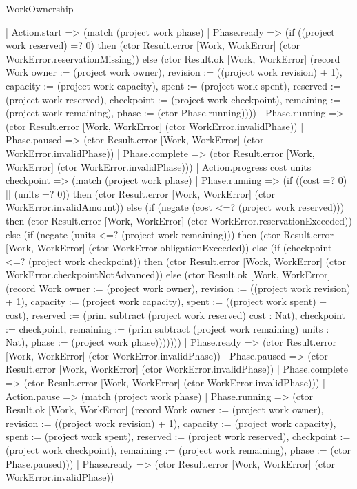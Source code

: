 \begin{lexlean}{WorkOwnership}
\begin{semanticmodule}
{    | Action.start => (match (project work phase)
      | Phase.ready => (if ((project work reserved) =? 0) then (ctor Result.error [Work, WorkError] (ctor WorkError.reservationMissing)) else (ctor Result.ok [Work, WorkError] (record Work {owner := (project work owner), revision := ((project work revision) + 1), capacity := (project work capacity), spent := (project work spent), reserved := (project work reserved), checkpoint := (project work checkpoint), remaining := (project work remaining), phase := (ctor Phase.running)})))
      | Phase.running => (ctor Result.error [Work, WorkError] (ctor WorkError.invalidPhase))
      | Phase.paused => (ctor Result.error [Work, WorkError] (ctor WorkError.invalidPhase))
      | Phase.complete => (ctor Result.error [Work, WorkError] (ctor WorkError.invalidPhase)))
    | Action.progress cost units checkpoint => (match (project work phase)
      | Phase.running => (if ((cost =? 0) || (units =? 0)) then (ctor Result.error [Work, WorkError] (ctor WorkError.invalidAmount)) else (if (negate (cost <=? (project work reserved))) then (ctor Result.error [Work, WorkError] (ctor WorkError.reservationExceeded)) else (if (negate (units <=? (project work remaining))) then (ctor Result.error [Work, WorkError] (ctor WorkError.obligationExceeded)) else (if (checkpoint <=? (project work checkpoint)) then (ctor Result.error [Work, WorkError] (ctor WorkError.checkpointNotAdvanced)) else (ctor Result.ok [Work, WorkError] (record Work {owner := (project work owner), revision := ((project work revision) + 1), capacity := (project work capacity), spent := ((project work spent) + cost), reserved := (prim subtract (project work reserved) cost : Nat), checkpoint := checkpoint, remaining := (prim subtract (project work remaining) units : Nat), phase := (project work phase)}))))))
      | Phase.ready => (ctor Result.error [Work, WorkError] (ctor WorkError.invalidPhase))
      | Phase.paused => (ctor Result.error [Work, WorkError] (ctor WorkError.invalidPhase))
      | Phase.complete => (ctor Result.error [Work, WorkError] (ctor WorkError.invalidPhase)))
    | Action.pause => (match (project work phase)
      | Phase.running => (ctor Result.ok [Work, WorkError] (record Work {owner := (project work owner), revision := ((project work revision) + 1), capacity := (project work capacity), spent := (project work spent), reserved := (project work reserved), checkpoint := (project work checkpoint), remaining := (project work remaining), phase := (ctor Phase.paused)}))
      | Phase.ready => (ctor Result.error [Work, WorkError] (ctor WorkError.invalidPhase))
}
\end{semanticmodule}
\end{lexlean}
